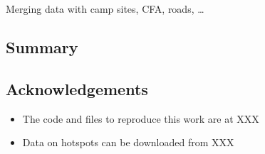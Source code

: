 Merging data with camp sites, CFA, roads, \ldots{}

\hypertarget{summary}{%
\subsection{Summary}\label{summary}}

\hypertarget{acknowledgements}{%
\subsection{Acknowledgements}\label{acknowledgements}}

\begin{itemize}
\tightlist
\item
  The code and files to reproduce this work are at XXX
\item
  Data on hotspots can be downloaded from XXX
\end{itemize}




\address{%
Weihao Li\\
Monash University\\%
line 1\\ line 2\\
%
%
%
\\\href{mailto:wlii0039@student.monash.edu}{\nolinkurl{wlii0039@student.monash.edu}}
}

\address{%
Emily Dodwell\\
AT\&T\\%
line 1\\ line 2\\
%
%
%
\\\href{mailto:emdodwell@gmail.com}{\nolinkurl{emdodwell@gmail.com}}
}

\address{%
Dianne Cook\\
Monash University\\%
line 1\\ line 2\\
%
%
%
\\\href{mailto:dicook@monash.edu}{\nolinkurl{dicook@monash.edu}}
}

